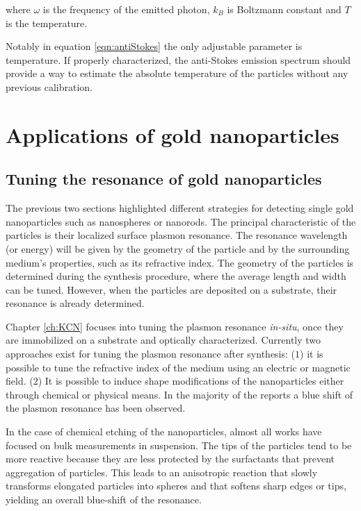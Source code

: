 \noindent where $\omega$ is the frequency of the emitted photon, $k_B$ is
Boltzmann constant and $T$ is the temperature. 

Notably in equation \ref{eqn:antiStokes} the only adjustable parameter is
temperature. If properly characterized, the anti-Stokes emission spectrum should
provide a way to estimate the absolute temperature of the particles
without any previous calibration.

\section{Applications of gold nanoparticles}
\subsection{Tuning the resonance of gold nanoparticles}
The previous two sections highlighted different strategies for detecting single
gold nanoparticles such as nanospheres or nanorods. The principal characteristic
of the particles is their localized surface plasmon resonance. The resonance
wavelength (or energy) will be given by the geometry of the particle and by the
surrounding medium's properties, such as its refractive index. The geometry of
the particles is determined during the synthesis procedure, where the average
length and width can be tuned. However, when the particles are deposited on a
substrate, their resonance is already determined.

Chapter \ref{ch:KCN} focuses into tuning the plasmon resonance \textit{in-situ},
once they are immobilized on a substrate and optically characterized. Currently
two approaches exist for tuning the plasmon resonance after synthesis: ($1$) it
is possible to tune the refractive index of the medium using an electric or
magnetic field\cite{Kossyrev2005}. ($2$) It is possible to induce shape
modifications of the nanoparticles either through
chemical\cite{Jana2002,Rodriguez-Fernandez2005,Carbo-Argibay2007,Tsung2006,Ni2008}
or physical means\cite{Link2000,Horiguchi2008,Yorulmaz2012}. In the majority of
the reports a blue shift of the plasmon resonance has been observed.

In the case of chemical etching of the nanoparticles, almost all works have
focused on bulk measurements in suspension. The tips of the particles tend to be
more reactive because they are less protected by the surfactants that prevent
aggregation of particles. This leads to an anisotropic reaction that slowly
transforms elongated particles into spheres and that softens sharp edges or
tips, yielding an overall blue-shift of the resonance. 

